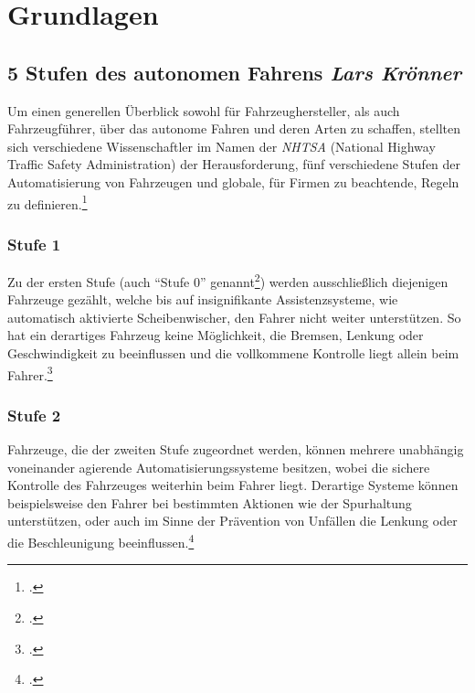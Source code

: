 \documentclass[a4paper, 12pt, openany]{book}
\newcommand\Section[2]{\section[#1 {\scriptsize\itshape#2}]{#1 \footnotesize\itshape#2}}
\begin{document}

        
    \chapter{Grundlagen}
        \Section{5 Stufen des autonomen Fahrens}{Lars Krönner}\label{5stufen}
            Um einen generellen Überblick sowohl für Fahrzeughersteller, als auch Fahrzeugführer, über das autonome Fahren und deren Arten zu schaffen, stellten sich verschiedene Wissenschaftler im Namen der \textit{NHTSA} (National Highway Traffic Safety Administration) der Herausforderung, fünf verschiedene Stufen der Automatisierung von Fahrzeugen und globale, für Firmen zu beachtende, Regeln zu definieren.\footcite[1--2]{national2013preliminary}
            
            \subsection*{Stufe 1}
                Zu der ersten Stufe (auch \enquote{Stufe 0} genannt\footcite[S. 4]{national2013preliminary}) werden ausschließlich diejenigen Fahrzeuge gezählt, welche bis auf insignifikante Assistenzsysteme, wie automatisch aktivierte Scheibenwischer, den Fahrer nicht weiter unterstützen. So hat ein derartiges Fahrzeug keine Möglichkeit, die Bremsen, Lenkung oder Geschwindigkeit zu beeinflussen und die vollkommene Kontrolle liegt allein beim Fahrer.\footcite[4]{national2013preliminary}
            \subsection*{Stufe 2}
                Fahrzeuge, die der zweiten Stufe zugeordnet werden, können mehrere unabhängig voneinander agierende Automatisierungssysteme besitzen, wobei die sichere Kontrolle des Fahrzeuges weiterhin beim Fahrer liegt.
                Derartige Systeme können beispielsweise den Fahrer bei bestimmten Aktionen wie der Spurhaltung unterstützen, oder auch im Sinne der Prävention von Unfällen die Lenkung oder die Beschleunigung beeinflussen.\footcite[4]{national2013preliminary}
\end{document}
